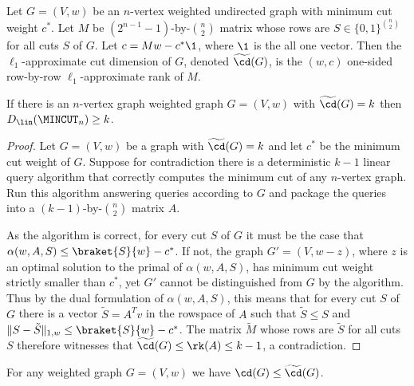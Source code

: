 \begin{definition}
Let {$G = (V,w)$} be an $n$-vertex weighted undirected graph with minimum cut weight $c^*$.
Let $M$ be $(2^{n-1}-1)$-by-$\binom{n}{2}$ matrix whose rows are $S \in  \{0,1\}^{\binom{n}{2}}$ for all cuts $S$ of $G$.
Let $c = Mw - c^*\1$, where $\1$ is the all one vector.  Then the $\ell_1$-approximate cut dimension of $G$, denoted $\widetilde{\cd}(G)$, is
the $(w,c)$ one-sided row-by-row $\ell_1$-approximate rank of $M$.
\end{definition}

\begin{theorem}
\label{thm:approx_cut}
If there is an $n$-vertex graph {weighted graph $G = (V,w)$} with $\widetilde{\cd}(G) = k$
then $D_\lin(\MINCUT_n) \ge k$.
\end{theorem}

\begin{proof}
Let $G = (V,w)$ be a graph with $\widetilde{\cd}(G) = k$ and let $c^*$ be the minimum cut weight of $G$.  Suppose for
contradiction there is a deterministic $k-1$ linear query algorithm that correctly computes the minimum cut of any
$n$-vertex graph.  Run this algorithm answering queries according to $G$ and
package the queries into a $(k-1)$-by-$\binom{n}{2}$ matrix $A$.

As the algorithm is correct, for every cut $S$ of $G$ it must be the case that $\alpha(w,A,S) \le \braket{S}{w} -c^*$.  If not, the graph $G' = (V,w-z)$, where $z$ is an optimal
solution to the primal of $\alpha(w,A,S)$, has minimum cut weight strictly smaller than $c^*$, yet $G'$ cannot be distinguished from $G$ by the algorithm.
Thus by the dual formulation of $\alpha(w,A,S)$, this means that for every cut $S$ of $G$ there is a vector $\tilde{S}= A^T v$ in the rowspace of $A$ such
that $\tilde S \le S$ and $\|S-\tilde{S}\|_{1,w} \le \braket{S}{w} -c^*$.  The matrix $\tilde M$ whose rows are $\tilde S$ for all
cuts $S$ therefore witnesses that $\widetilde{\cd}(G) \le \rk(A) \le k-1$, a contradiction.
\end{proof}

\begin{lemma}
\label{lem:cdless}
For any weighted graph $G = (V,w)$ we have $\cd(G) \le \widetilde{\cd}(G)$.
\end{lemma}

